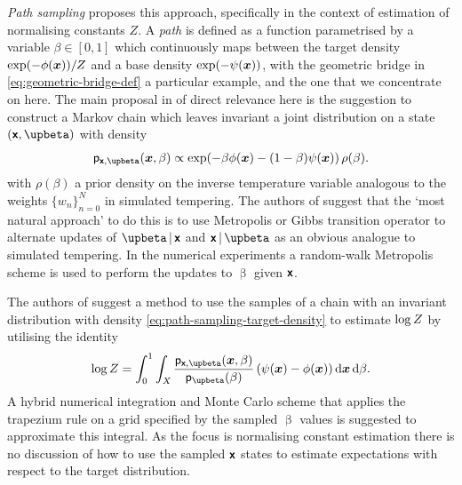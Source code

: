 \emph{Path sampling} \citep{gelman1998simulating} proposes this approach, specifically in the context of estimation of normalising constants $Z$. A \emph{path} is defined as a function parametrised by a variable $\beta \in [0,1]$ which continuously maps between the target density $\exp\lpa-\phi(\vct{x})\rpa / \normconst$  and a base density $\exp\lpa-\psi(\vct{x})\rpa$, with the geometric bridge in \eqref{eq:geometric-bridge-def} a particular example, and the one that we concentrate on here.  The main proposal in \citep{gelman1998simulating} of direct relevance here is the suggestion to construct a Markov chain which leaves invariant a joint distribution on a state $(\rvct{x},\upbeta)$ with density
\vspace{-1mm}
\begin{equation}\label{eq:path-sampling-target-density}
\pden{\rvct{x},\upbeta}(\vct{x},\beta) \propto 
\exp\lpa -\beta\phi(\vct{x}) - (1-\beta)\psi(\vct{x}) \rpa\,\rho(\beta).
\end{equation}
with $\rho(\beta)$ a prior density on the inverse temperature variable analogous to the weights $\lbrace w_n \rbrace_{n=0}^N$ in simulated tempering. The authors of \citep{gelman1998simulating} suggest that the `most natural approach' to do this is to use Metropolis or Gibbs transition operator to alternate updates of $\upbeta\gvn\rvct{x}$ and $\rvct{x}\gvn\upbeta$ as an obvious analogue to simulated tempering. In the numerical experiments a random-walk Metropolis scheme is used to perform the updates to $\upbeta$ given $\boldsymbol{\mathsf{x}}$.

The authors of \citep{gelman1998simulating} suggest a method to use the samples of a chain with an invariant distribution with density \eqref{eq:path-sampling-target-density} to estimate $\log Z$ by utilising the identity
\vspace{-1mm}
\begin{equation}\label{thermodynamic-integration-path-sampling}
\log \normconst =
\int_0^1 \int_{\set{X}}
  \frac{\pden{\rvct{x},\upbeta}(\vct{x},\beta)}{\pden{\upbeta}(\beta)}\,
  \lpa \psi(\vct{x}) - \phi(\vct{x}) \rpa
\,\dr\vct{x}\,\dr\beta.
\end{equation}
A hybrid numerical integration and Monte Carlo scheme that applies the trapezium rule on a grid specified by the sampled $\upbeta$ values is suggested to approximate this integral. As the focus is normalising constant estimation there is no discussion of how to use the sampled $\boldsymbol{\mathsf{x}}$ states to estimate expectations with respect to the target distribution.

